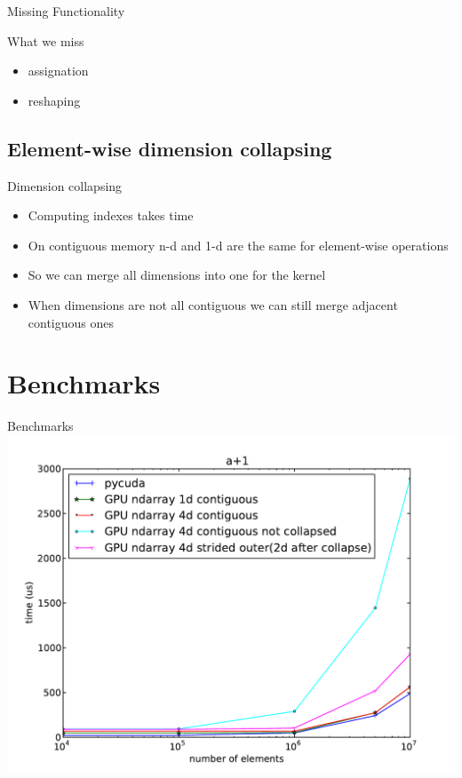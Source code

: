\documentclass[utf8x,xcolor=pdftex,dvipsnames,table]{beamer}
\begin{document}
\begin{frame}{Missing Functionality}
\begin{block}{What we miss}
\begin{itemize}
\item assignation
\item reshaping
\end{itemize}
\end{block}
\end{frame}

\subsection{Element-wise dimension collapsing}
\begin{frame}{Dimension collapsing}
\begin{itemize}
\item Computing indexes takes time
\item On contiguous memory n-d and 1-d are the same for element-wise operations
\item So we can merge all dimensions into one for the kernel
\item When dimensions are not all contiguous we can still merge adjacent contiguous ones
\end{itemize}
\end{frame}

\section{Benchmarks}
\begin{frame}{Benchmarks}
\includegraphics[width=\textwidth]{ap1_no_alloc}
\end{frame}
\end{document}
